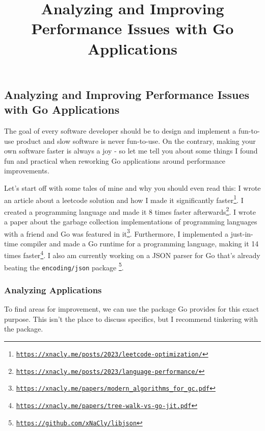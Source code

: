 

\title{Analyzing and Improving Performance Issues with Go Applications}


    \subsection*{Analyzing and Improving Performance Issues with Go Applications}

    The goal of every software developer should be to design and implement a
    fun-to-use product and slow software is never fun-to-use. On the contrary,
    making your own software faster is always a joy - so let me tell you about
    some things I found fun and practical when reworking Go applications around
    performance improvements.

    Let's start off with some tales of mine and why you should even read this: I
    wrote an article about a leetcode solution and how I made it significantly
    faster\footnote{\href{https://xnacly.me/posts/2023/leetcode-optimization/}{\texttt{https://xnacly.me/posts/2023/leetcode-optimization/}}}.
    I created a programming language and made it 8 times faster
    afterwards\footnote{\href{https://xnacly.me/posts/2023/language-performance/}{\texttt{https://xnacly.me/posts/2023/language-performance/}}}.
    I wrote a paper about the garbage collection implementations of programming
    languages with a friend and Go was featured in
    it\footnote{\href{https://xnacly.me/papers/modern_algorithms_for_gc.pdf}{\texttt{https://xnacly.me/papers/modern\_algorithms\_for\_gc.pdf}}}.
    Furthermore, I implemented a just-in-time compiler and made a Go runtime
    for a programming language, making it 14 times
    faster\footnote{\href{https://xnacly.me/papers/tree-walk-vs-go-jit.pdf}{\texttt{https://xnacly.me/papers/tree-walk-vs-go-jit.pdf}}}.
    I also am currently working on a JSON parser for Go that's already beating
    the \texttt{encoding/json} package
    \footnote{\href{https://github.com/xNaCly/libjson}{\texttt{https://github.com/xNaCly/libjson}}}.

    \subsubsection*{Analyzing Applications}

    To find areas for improvement, we can use the package Go provides for this
    exact purpose. This isn't the place to discuss specifics, but I recommend
    tinkering with the package.

